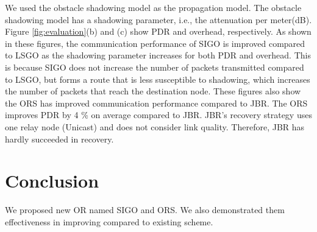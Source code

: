 \documentclass{comex}
\begin{document}
We used the obstacle shadowing model\cite{obstacle} as the propagation model. The obstacle shadowing model has a shadowing parameter, i.e., the attenuation per meter(dB). 
Figure \ref{fig:evaluation}(b) and (c) show PDR and overhead, respectively.  As shown in these figures, the communication performance of SIGO is improved compared to LSGO as the shadowing parameter increases for both PDR and overhead. This is because SIGO does not increase the number of packets transmitted compared to LSGO, but forms a route that is less susceptible to shadowing, which increases the number of packets that reach the destination node. These figures also show the ORS has improved communication performance compared to JBR. The ORS improves PDR by 4 \% on average compared to JBR. JBR's recovery strategy uses one relay node (Unicast) and does not consider link quality. Therefore, JBR has hardly succeeded in recovery. 

 


\section{Conclusion}
We proposed new OR named SIGO and ORS. We also demonstrated them effectiveness in improving compared to existing scheme.




\end{document}
